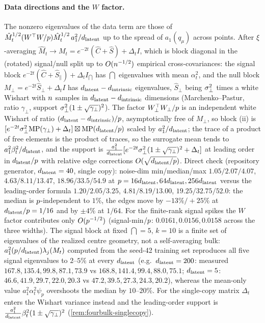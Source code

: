 \paragraph{Data directions and the $W$ factor.}
The nonzero eigenvalues of the data term are those of $\hat M_t^{1/2}(W^\top W/p)\hat M_t^{1/2}\,a_1^2/d_{\mathrm{latent}}$ up to the spread of $a_1(q_\mu)$ across points. After $\xi$-averaging $\hat M_t\to M_t=e^{-2t}(\hat C+\hat S)+\Delta_t I$, which is block diagonal in the (rotated) signal/null split up to $O(n^{-1/2})$ empirical cross-covariances: the signal block $e^{-2t}(\hat C+\hat S_\parallel)+\Delta_t I_{\dint}$ has $\dint$ eigenvalues with mean $\alpha_t^2$, and the null block $M_\perp=e^{-2t}\hat S_\perp+\Delta_t I$ has $d_{\mathrm{latent}}-d_{\mathrm{intrinsic}}$ eigenvalues, $\hat S_\perp$ being $\sigma_{\perp}^2$ times a white Wishart with $n$ samples in $d_{\mathrm{latent}}-d_{\mathrm{intrinsic}}$ dimensions (Marchenko--Pastur, ratio $\gamma_\perp$, support $\sigma_{\perp}^2(1\pm\sqrt{\gamma_\perp})^2$). The factor $W_\perp^\top W_\perp/p$ is an independent white Wishart of ratio $(d_{\mathrm{latent}}-d_{\mathrm{intrinsic}})/p$, asymptotically free of $M_\perp$, so block (ii) is $[e^{-2t}\sigma_{\perp}^2\mathrm{MP}(\gamma_\perp)+\Delta_t]\boxtimes\mathrm{MP}(d_{\mathrm{latent}}/p)$ scaled by $a_1^2/d_{\mathrm{latent}}$; the trace of a product of free elements is the product of traces, so the surrogate mean tends to $a_1^2\beta_t^2/d_{\mathrm{latent}}$, and the support is $\tfrac{a_1^2}{d_{\mathrm{latent}}}[e^{-2t}\sigma_{\perp}^2(1\pm\sqrt{\gamma_\perp})^2+\Delta_t]$ at leading order in $d_{\mathrm{latent}}/p$ with relative edge corrections $O(\sqrt{d_{\mathrm{latent}}/p})$. Direct check (repository generator, $d_{\mathrm{latent}}=40$, single copy): noise-dim min/median/max $1.05/2.07/4.07$, $4.63/8.11/13.47$, $18.96/33.5/54.9$ at $p=16d_{\mathrm{latent}},64d_{\mathrm{latent}},256d_{\mathrm{latent}}$ versus the leading-order formula $1.20/2.05/3.25$, $4.81/8.19/13.00$, $19.25/32.75/52.0$: the median is $p$-independent to $1\%$, the edges move by $-13\%/+25\%$ at $d_{\mathrm{latent}}/p=1/16$ and by $\pm4\%$ at $1/64$. For the finite-rank signal spikes the $W$ factor contributes only $O(p^{-1/2})$ (signal-min$/p$: $0.0161,0.0156,0.0158$ across the three widths). The signal block at fixed $\dint=5$, $k=10$ is a finite set of eigenvalues of the realized centre geometry, not a self-averaging bulk: $a_1^2(p/d_{\mathrm{latent}})\lambda_j(M_t)$ computed from the seed-42 training set reproduces all five signal eigenvalues to $2$--$5\%$ at every $d_{\mathrm{latent}}$ (e.g.\ $d_{\mathrm{latent}}=200$: measured $167.8,135.4,99.8,87.1,73.9$ vs $168.8,141.4,99.4,88.0,75.1$; $d_{\mathrm{latent}}=5$: $46.6,41.9,29.7,22.0,20.3$ vs $47.2,39.5,27.3,24.3,20.2$), whereas the mean-only value $a_1^2\alpha_t^2\psi_p$ overshoots the median by $10$--$20\%$. For the single-copy matrix $\Delta_t$ enters the Wishart variance instead and the leading-order support is $\tfrac{a_1^2}{d_{\mathrm{latent}}}\beta_t^2(1\pm\sqrt{\gamma_\perp})^2$ (\cref{rem:fourbulk-singlecopy}).


